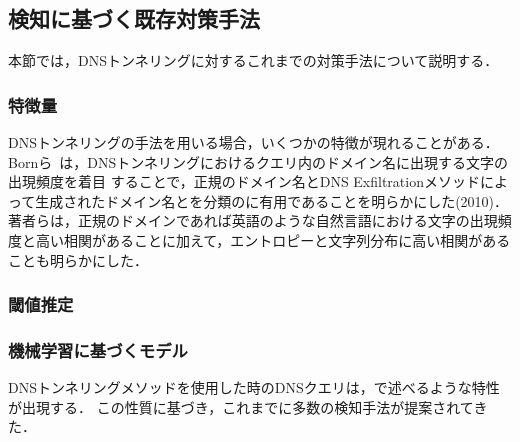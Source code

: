 \subsection{検知に基づく既存対策手法}
本節では，DNSトンネリングに対するこれまでの対策手法について説明する．
\subsubsection{特徴量}
DNSトンネリングの手法を用いる場合，いくつかの特徴が現れることがある．
Bornら~\cite{born}は，DNSトンネリングにおけるクエリ内のドメイン名に出現する文字の出現頻度を着目
することで，正規のドメイン名とDNS Exfiltrationメソッドによって生成されたドメイン名とを分類のに有用であることを明らかにした(2010)．
著者らは，正規のドメインであれば英語のような自然言語における文字の出現頻度と高い相関があることに加えて，エントロピーと文字列分布に高い相関があることも明らかにした．


\subsubsection{閾値推定}
\subsubsection{機械学習に基づくモデル}
DNSトンネリングメソッドを使用した時のDNSクエリは，で述べるような特性が出現する．
この性質に基づき，これまでに多数の検知手法が提案されてきた．
